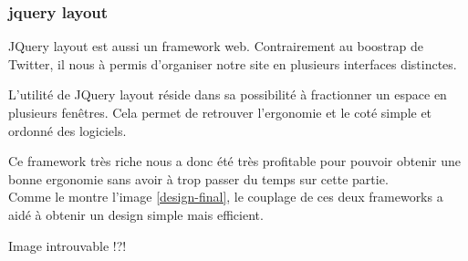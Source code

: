 \subsubsection{jquery layout}

JQuery layout est aussi un framework web. Contrairement au boostrap de Twitter, il nous à permis d'organiser notre site en plusieurs interfaces distinctes. 

L'utilité de JQuery layout réside dans sa possibilité à fractionner un espace en plusieurs fenêtres. Cela permet de retrouver l'ergonomie et le coté simple et ordonné des logiciels. 

Ce framework très riche nous a donc été très profitable pour pouvoir obtenir une bonne ergonomie sans avoir
à trop passer du temps sur cette partie.
\\


Comme le montre l'image \ref{design-final}, le couplage de ces deux frameworks a aidé à obtenir un design simple mais efficient. 

{\Large Image introuvable !?!}


